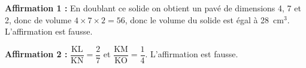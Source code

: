 
\medskip
 
%
%
%
%
%
\textbf{Affirmation 1 :}  En doublant ce solide on obtient un pavé de dimensions 4, 7 et 2, donc de volume $4 \times 7 \times 2 = 56$, donc le volume du solide est égal à 28~cm$^3$. L'affirmation est fausse.

\textbf{Affirmation 2 :} $\dfrac{\text{KL}}{\text{KN}} = \dfrac{2}{7}$ et $\dfrac{\text{KM}}{\text{KO}} = \dfrac{1}{4}$. L'affirmation est fausse.

